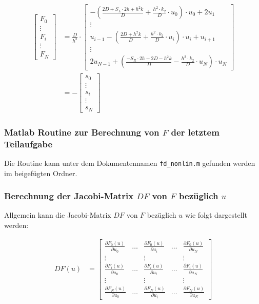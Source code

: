\documentclass[
	pagesize,
	fontsize=12pt,
	paper=a4,
	oneside,
   reqno
]{scrartcl}
\begin{document}
\begin{align*}
   \begin{bmatrix*}
      F_0 \\
      \vdots \\
      F_i \\
      \vdots \\
      F_{N}
   \end{bmatrix*}
   &=\frac{D}{h^2}\cdot
   \begin{bmatrix*}
      -\left( \frac{2D+S_L\cdot 2h+h^2k}{D}+\frac{h^2\cdot k_2}{D}\cdot u_0\right) \cdot u_0 + 2u_1 \\
      \vdots \\
      u_{i-1}-\left( \frac{2D+h^2k}{D}+\frac{h^2\cdot k_2}{D}\cdot u_i\right) \cdot u_i+u_{i+1} \\
      \vdots \\
      2u_{N-1} + \left( \frac{-S_R\cdot 2h-2D-h^2k}{D}-\frac{h^2\cdot k_2}{D}\cdot u_N\right) \cdot u_N
   \end{bmatrix*}
   \\
   &= -
   \begin{bmatrix*}
      s_0 \\
      \vdots \\
      s_i \\
      \vdots \\
      s_N
   \end{bmatrix*}
\end{align*}

\subsubsection{Matlab Routine zur Berechnung von $F$ der letztem Teilaufgabe}

Die Routine kann unter dem Dokumentennamen \texttt{fd\_nonlin.m} gefunden werden im beigefügten Ordner.

\subsubsection{Berechnung der Jacobi-Matrix $DF$ von $F$ bezüglich $u$}

Allgemein kann die Jacobi-Matrix $DF$ von $F$ bezüglich $u$ wie folgt dargestellt werden:

\begin{align*}
   DF(u) &=
   \begin{bmatrix*}
      \frac{\partial F_0(u)}{\partial u_0} & \hdots & \frac{\partial F_0(u)}{\partial u_i} & \hdots & \frac{\partial F_0(u)}{\partial u_{N}} \\
      \vdots & & \vdots & & \vdots \\
      \frac{\partial F_i(u)}{\partial u_0} & \hdots & \frac{\partial F_i(u)}{\partial u_i} & \hdots & \frac{\partial F_i(u)}{\partial u_{N}} \\
      \vdots & & \vdots & & \vdots \\
      \frac{\partial F_N(u)}{\partial u_0} & \hdots & \frac{\partial F_N(u)}{\partial u_i} & \hdots & \frac{\partial F_N(u)}{\partial u_{N}}
   \end{bmatrix*}
\end{align*}
\end{document}
